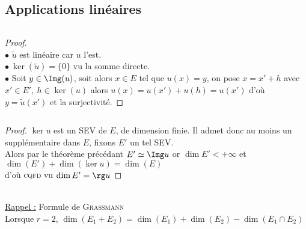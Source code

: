	\subsection{Applications linéaires}
		${}$ \\
		\begin{proof} ${}$\\
		$\bullet$ $\tilde{u}$ est linéaire car $u$ l'est.\\
		$\bullet ~ \ker (\tilde{u}) = \{0\}$ vu la somme directe.\\
		$\bullet$ Soit $y\in \Img (u)$, soit alors $x\in E$ tel que $u(x)=y$, on pose $x=x'+h$ avec $x'\in E' ,~h\in \ker(u)$ alors $u(x)=u(x')+u(h)=u(x')$ d'où $y=\tilde{u}(x')$ et la surjectivité.
		\end{proof}
		${}$\\
		\begin{proof}
		$\ker u$ est un SEV de $E$, de dimension finie. Il admet donc au moins un supplémentaire dans $E$, fixons $E'$ un tel SEV.\\
		Alors par le théorème précédant $E'\simeq \Img u$ or $\dim E' <+\infty$ et $\dim (E') + \dim (\ker u) = \dim (E)$ \\
		d'où \textsc{cqfd} vu $\dim E' = \rg u$
		\end{proof}
		${}$ \\
		\\ \uline{Rappel :} Formule de \textsc{Grassmann}\\
		Lorsque $r=2$, $\dim (E_1+E_2) = \dim(E_1) +\dim(E_2) - \dim(E_1\cap E_2)$
	
